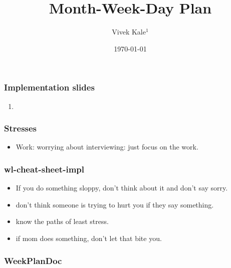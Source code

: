 \documentclass[serif, mathserif, final]{beamer}
\title{Month-Week-Day Plan}
\author{Vivek Kale$^1$}
\institute{$^1$ University of Illinois at Urbana-Champaign}
\date{\today}
\begin{document}
%

      \begin{frame}
        \frametitle{Implementation slides}
        \begin{enumerate}
          
        \item \tiny 
        \end{enumerate}
      \end{frame}

      \begin{frame}
        \frametitle{Stresses}
        \begin{itemize}
        \item \tiny Work: worrying about interviewing: just
          focus on the work.
        \end{itemize}
      \end{frame}

      \begin{frame}
        \frametitle{wl-cheat-sheet-impl}
        \begin{itemize}
          \tiny \item \tiny If you do something sloppy, don't
          think about it and don't say sorry.
        \item \tiny don't think someone is trying to hurt you if
          they say something.
        \item \tiny know the paths of least stress.
        \item \tiny if mom does something, don't let that bite you.
        \end{itemize}
      \end{frame} 

      \begin{frame}
        \frametitle{WeekPlanDoc}
        \begin{itemize}
        \end{itemize}
      \end{frame} 
\end{document}
